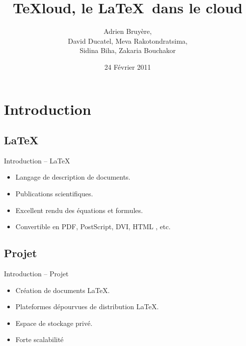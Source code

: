 \documentclass{beamer}
\title{TeXloud, le \LaTeX \ dans le cloud}
\author[Bruyère, Ducatel, Rakotondratsima, Biha, Bouchakor]{Adrien Bruyère,\\David Ducatel, Meva Rakotondratsima,\\Sidina Biha, Zakaria Bouchakor}
\institute{Université du Havre}
\date{24 Février 2011}
\begin{document}
\begin{frame} %
  \titlepage
\end{frame}



\section{Introduction}
\subsection{\LaTeX}
\begin{frame}{Introduction -- \LaTeX}
	\begin{itemize}
	\item Langage de description de documents.
	\item Publications scientifiques.
	\item Excellent rendu des équations et formules.
	\item Convertible en PDF, PostScript, DVI, HTML , etc.
	\end{itemize}
\end{frame}


\subsection{Projet}
\begin{frame}{Introduction -- Projet}
	\begin{itemize}
	 \item Création de documents \LaTeX.
     \item Plateformes dépourvues de distribution \LaTeX.
     \item Espace de stockage privé.
     \item Forte scalabilité
	\end{itemize}
\end{frame}
\end{document}
